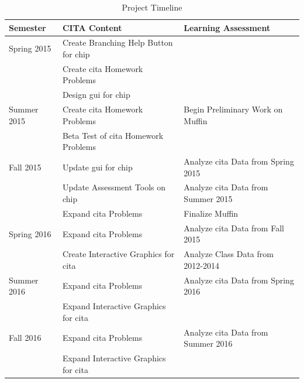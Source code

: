 \begin{landscape}
\begin{table}[!ht]
  \centering
  \begin{tabular}{|l|l|l|}
    \hline
    \textbf{Semester} & \textbf{CITA Content} & \textbf{Learning Assessment}\\
	\hline
	Spring 2015 & Create Branching Help Button for \gls{chip} & \\
	& Create \gls{cita} Homework Problems & \\
	& Design \gls{gui} for \gls{chip} & \\
	\hline
	Summer 2015 & Create \gls{cita} Homework Problems & Begin Preliminary Work on Muffin\\
	& Beta Test of \gls{cita} Homework Problems &  \\
	\hline
	Fall 2015 & Update \gls{gui} for \gls{chip} & Analyze \gls{cita} Data from Spring 2015 \\
	& Update Assessment Tools on \gls{chip} & Analyze \gls{cita} Data from Summer 2015 \\
	& Expand \gls{cita} Problems & Finalize Muffin \\
	\hline
	Spring 2016 & Expand \gls{cita} Problems & Analyze \gls{cita} Data from Fall 2015 \\
	& Create Interactive Graphics for \gls{cita} & Analyze Class Data from 2012-2014 \\
	\hline
	Summer 2016 & Expand \gls{cita} Problems & Analyze \gls{cita} Data from Spring 2016 \\
	& Expand Interactive Graphics for \gls{cita} & \\
	\hline
	Fall 2016 & Expand \gls{cita} Problems & Analyze \gls{cita} Data from Summer 2016 \\
	& Expand Interactive Graphics for \gls{cita} & \\
	\hline
  \end{tabular}
  \caption{Project Timeline}
  \label{tab:timeline}
\end{table}
\end{landscape}